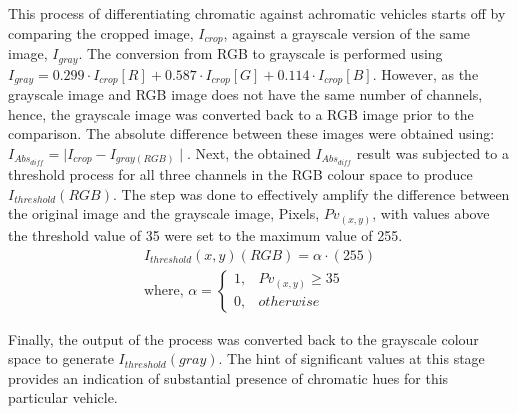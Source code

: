 This process of differentiating chromatic against achromatic vehicles starts off by comparing the cropped image, $I_{crop}$, against a grayscale version of the same image, $I_{gray}$. The conversion from RGB to grayscale is performed using $I_{gray} = 0.299 \cdot I_{crop}[R]+0.587 \cdot I_{crop}[G]+0.114 \cdot I_{crop}[B]$. However, as the grayscale image and RGB image does not have the same number of channels, hence, the grayscale image was converted back to a RGB image prior to the comparison.
The absolute difference between these images were obtained using: $I_{Abs_{diff}} = \mid I_{crop} - I_{gray(RGB)} \mid$. Next, the obtained $I_{Abs_{diff}}$ result was subjected to a threshold process for all three channels in the RGB colour space to produce $I_{threshold}(RGB)$.
The step was done to effectively amplify the difference between the original image and the grayscale image, Pixels, $Pv_{(x,y)}$, with values above the threshold value of 35 were set to the maximum value of 255.
\begin{align*}
\label{eq:threshabsolutediff}
I_{threshold}(x,y)(RGB) = \alpha \cdot (255) \\
\text{where, }
\alpha =
\begin{cases}
1, & Pv_{(x,y)} \geq 35\\
0, & otherwise
\end{cases}
\end{align*}

 Finally, the output of the process was converted back to the grayscale colour space to generate $I_{threshold}(gray)$. The hint of significant values at this stage provides an indication of substantial presence of chromatic hues for this particular vehicle.


